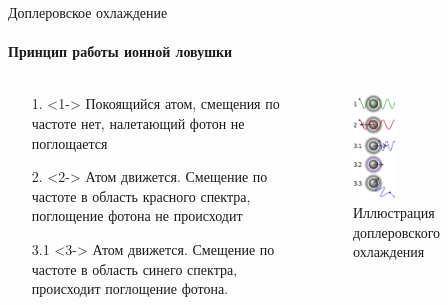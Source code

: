 \documentclass{beamer}
\begin{document}
    \begin{frame}{Доплеровское охлаждение}
    \framesubtitle{Принцип работы ионной ловушки}

        \begin{columns}

        \begin{column}{0.5\textwidth}

            \begin{itemize}
                \item[1.] <1-> Покоящийся атом, смещения по частоте нет, налетающий фотон
                               не поглощается
                \item[2.] <2-> Атом движется. Смещение по частоте в область красного спектра,
                               поглощение фотона не происходит
                \item[3.1] <3-> Атом движется. Смещение по частоте в область синего спектра,
                                происходит поглощение фотона.
            \end{itemize}

        \end{column}

        \begin{column}{0.5\textwidth}
            \begin{figure}
                \centering
                \includegraphics[width=0.35\textwidth]{media/dopler-cooling.png}
                \caption{Иллюстрация доплеровского охлаждения}
            \end{figure}
        \end{column}

        \end{columns}
    \end{frame}
\end{document}
